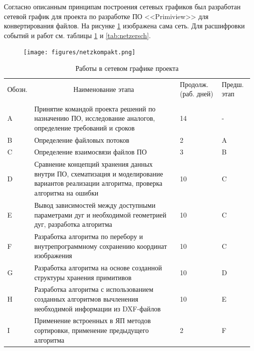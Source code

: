 Согласно описанным принципам построения сетевых графиков был разработан сетевой график для проекта по разработке ПО <<Primiview>> для конвертирования файлов. На рисунке \ref{fig:netzkompakt} изображена сама сеть. Для расшифровки событий и работ см. таблицы \ref{tab:netzarbeiten} и \ref{tab:netzersch}.

\begin{figure}[H]
	\centering
	\texttt{[image: figures/netzkompakt.png]}
	\label{fig:netzkompakt}
\end{figure}

\begin{longtable}{|m{}|p{}|m{}|m{}|}
	\caption{Работы в сетевом графике проекта}
	\label{tab:netzarbeiten}
	\centering
	\tabularnewline
	\hline
	\multicolumn{1}{|m{0.10\textwidth}|}{Обозн.}&\multicolumn{1}{c|}{Наименование этапа}&\multicolumn{1}{m{0.12\textwidth}|}{Продолж.\newline (раб. дней)}&\multicolumn{1}{m{0.10\textwidth}|}{Предш. этап}\\
	\hline \endfirsthead
	\subcaption{Продолжение таблицы~\ref{tab:netzarbeiten}}\\
	\hline \endhead
	\subcaption{Продолжение на след. стр.}
	\endfoot
	\endlastfoot
	A&Принятие командой проекта решений по назначению ПО, исследование аналогов, определение требований и сроков&14&-\\ \hline
	B&Определение файловых потоков&2&A\\ \hline
	C&Определение взаимосвязи файлов ПО&3&B\\ \hline
	D&Сравнение концепций хранения данных внутри ПО, схематизация и моделирование вариантов реализации алгоритма, проверка алгоритма на ошибки&10&C\\ \hline
	E&Вывод зависимостей между доступными параметрами дуг и необходимой геометрией дуг, разработка алгоритма&10&C\\ \hline
	F&Разработка алгоритма по перебору и внутрепрограммному сохранению координат изображения&10&C\\ \hline
	G&Разработка алгоритма на основе созданной структуры хранения примитивов&10&D\\ \hline
	H&Разработка алгоритма с использованием созданных алгоритмов вычленения необходимой информации из DXF-файлов&10&E\\ \hline
	I&Применение встроенных в ЯП методов сортировки, применение предыдущего алгоритма&2&F\\ \hline

\end{longtable}

